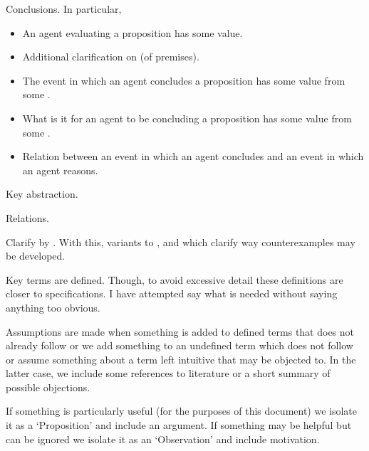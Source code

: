 \begin{note}
  \begin{TOCEnum}
  \item

    Conclusions.
    In particular,

    \begin{itemize}
    \item
      An agent evaluating a proposition has some value.
    \item
      Additional clarification on \pool{} (of premises).
    \item
      The event in which an agent concludes a proposition has some value from some \pool{}.
    \item
      What is it for an agent to be concluding a proposition has some value from some \pool{}.
    \item
      Relation between an event in which an agent concludes and an event in which an agent reasons.
    \end{itemize}
  \item

    Key abstraction.
  \item

    Relations.

    Clarify by .
    With this, variants to \qWhy{}, \qHow{} and \issueInclusion{} which clarify way counterexamples may be developed.
  \end{TOCEnum}
\end{note}

\begin{note}
  Key terms are defined.
  Though, to avoid excessive detail these definitions are closer to specifications.
  I have attempted say what is needed without saying anything too obvious.

  Assumptions are made when something is added to defined terms that does not already follow or we add something to an undefined term which does not follow or assume something about a term left intuitive that may be objected to.
  In the latter case, we include some references to literature or a short summary of possible objections.

  If something is particularly useful (for the purposes of this document) we isolate it as a `Proposition' and include an argument.
  If something may be helpful but can be ignored we isolate it as an `Observation' and include motivation.
\end{note}


